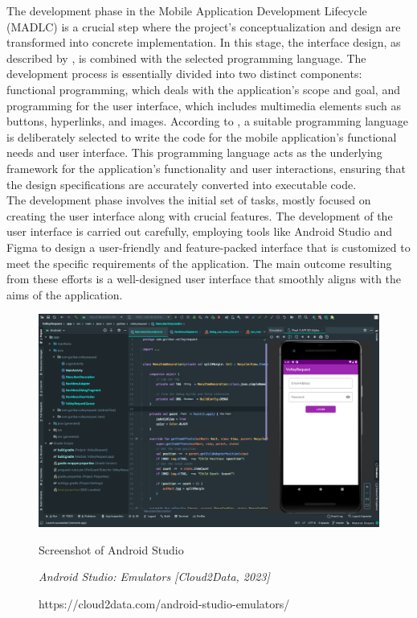 The development phase in the Mobile Application Development Lifecycle (MADLC) is a crucial step where the project's conceptualization and design are transformed into concrete implementation. In this stage, the interface design, as described by \textcite{shanmugam19}, is combined with the selected programming language. The development process is essentially divided into two distinct components: functional programming, which deals with the application's scope and goal, and programming for the user interface, which includes multimedia elements such as buttons, hyperlinks, and images. According to \textcite{wambua23}, a suitable programming language is deliberately selected to write the code for the mobile application's functional needs and user interface. This programming language acts as the underlying framework for the application's functionality and user interactions, ensuring that the design specifications are accurately converted into executable code. \\

The development phase involves the initial set of tasks, mostly focused on creating the user interface along with crucial features. The development of the user interface is carried out carefully, employing tools like Android Studio and Figma to design a user-friendly and feature-packed interface that is customized to meet the specific requirements of the application. The main outcome resulting from these efforts is a well-designed user interface that smoothly aligns with the aims of the application. \\

\begin{figure}[h]
    \centering
    \includegraphics[width=0.9\linewidth]{mainmatter/images/ssandroidstudio.png}
	\caption{Screenshot of Android Studio}
    \caption*{\textit{Android Studio: Emulators [Cloud2Data, 2023]}}
    \caption*{https://cloud2data.com/android-studio-emulators/}
    \label{fig:myfig35}
\end{figure}

